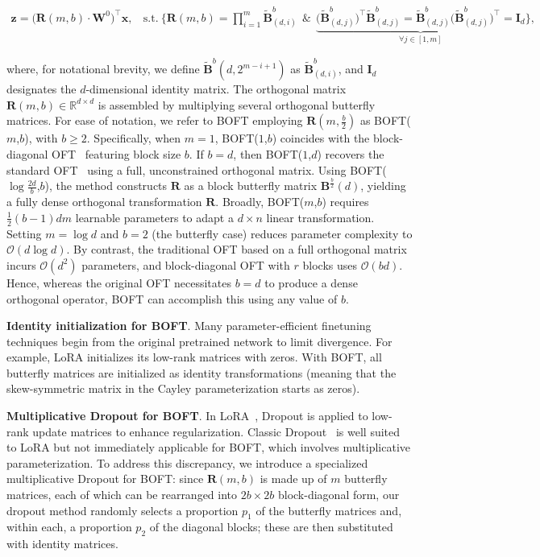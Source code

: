 \begin{equation}
    \begin{aligned}\nonumber
    \bm{z} = \big(\bm{R}(m,b)\cdot\bm{W}^0\big)^\top\bm{x},~~~~\text{s.t.}~\bigg\{\bm{R}(m,b)=\prod_{i=1}^m \tilde{\bm{B}}^b_{(d,i)}~~\&~~\underbrace{\big(\tilde{\bm{B}}^b_{(d,j)}\big)^\top\tilde{\bm{B}}^b_{(d,j)} = \tilde{\bm{B}}^b_{(d,j)}\big(\tilde{\bm{B}}^b_{(d,j)}\big)^\top = \bm{I}_d}_{\forall j\in [1, m]}\bigg\},
    \end{aligned}
\end{equation}

where, for notational brevity, we define $\tilde{\bm{B}}^b(d,2^{m - i+1})$ as $\tilde{\bm{B}}^b_{(d,i)}$, and $\bm{I}_d$ designates the $d$-dimensional identity matrix. The orthogonal matrix $\bm{R}(m,b) \in \mathbb{R}^{d \times d}$ is assembled by multiplying several orthogonal butterfly matrices. For ease of notation, we refer to BOFT employing $\bm{R}(m,\frac{b}{2})$ as BOFT($m$,$b$), with $b\geq 2$. Specifically, when $m=1$, BOFT($1$,$b$) coincides with the block-diagonal OFT~\cite{qiu2023controlling} featuring block size $b$. If $b=d$, then BOFT($1$,$d$) recovers the standard OFT~\cite{qiu2023controlling} using a full, unconstrained orthogonal matrix. Using BOFT($\log \frac{2d}{b}$,$b$), the method constructs $\bm{R}$ as a block butterfly matrix $\bm{B}^{\frac{b}{2}}(d)$, yielding a fully dense orthogonal transformation $\bm{R}$. Broadly, BOFT($m$,$b$) requires $\frac{1}{2}(b-1)dm$ learnable parameters to adapt a $d\times n$ linear transformation. Setting $m=\log d$ and $b=2$ (the butterfly case) reduces parameter complexity to $\mathcal{O}(d\log d)$. By contrast, the traditional OFT based on a full orthogonal matrix incurs $\mathcal{O}(d^2)$ parameters, and block-diagonal OFT with $r$ blocks uses $\mathcal{O}(bd)$. Hence, whereas the original OFT necessitates $b=d$ to produce a dense orthogonal operator, BOFT can accomplish this using any value of $b$.

\textbf{Identity initialization for BOFT}. Many parameter-efficient finetuning techniques begin from the original pretrained network to limit divergence. For example, LoRA initializes its low-rank matrices with zeros. With BOFT, all butterfly matrices are initialized as identity transformations (meaning that the skew-symmetric matrix in the Cayley parameterization starts as zeros).

\textbf{Multiplicative Dropout for BOFT}. In LoRA~\cite{hulora2022}, Dropout is applied to low-rank update matrices to enhance regularization. Classic Dropout~\cite{srivastava2014dropout} is well suited to LoRA but not immediately applicable for BOFT, which involves multiplicative parameterization. To address this discrepancy, we introduce a specialized multiplicative Dropout for BOFT: since $\bm{R}(m,b)$ is made up of $m$ butterfly matrices, each of which can be rearranged into $2b\times 2b$ block-diagonal form, our dropout method randomly selects a proportion $p_1$ of the butterfly matrices and, within each, a proportion $p_2$ of the diagonal blocks; these are then substituted with identity matrices.

